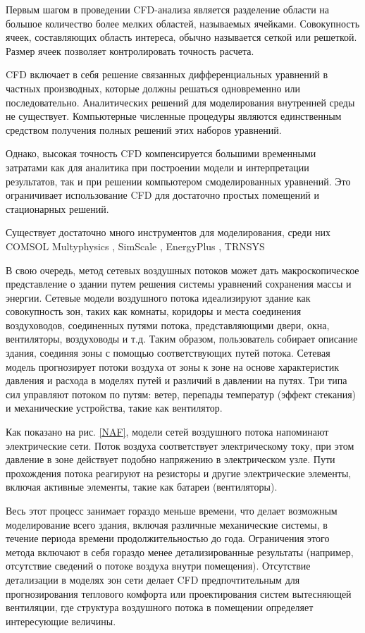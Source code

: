 Первым шагом в проведении CFD-анализа является разделение области на большое количество более мелких областей, называемых ячейками. Совокупность ячеек, составляющих область интереса, обычно называется сеткой или решеткой. Размер ячеек позволяет контролировать точность расчета.

CFD включает в себя решение связанных дифференциальных уравнений в частных производных, которые должны решаться одновременно или последовательно. Аналитических решений для моделирования внутренней среды не существует. Компьютерные численные процедуры являются единственным средством получения полных решений этих наборов уравнений.

Однако, высокая точность CFD компенсируется большими временными затратами как для аналитика при построении модели и интерпретации результатов, так и при решении компьютером смоделированных уравнений. Это ограничивает использование CFD для достаточно простых помещений и стационарных решений.

Существует достаточно много инструментов для моделирования, среди них COMSOL Multyphysics \cite{comsol}, SimScale \cite{simscale}, EnergyPlus \cite{energyplus}, TRNSYS \cite{trnsys}

\newpage

В свою очередь, метод сетевых воздушных потоков может дать макроскопическое представление о здании путем решения системы уравнений сохранения массы и энергии. Сетевые модели воздушного потока идеализируют здание как совокупность зон, таких как комнаты, коридоры и места соединения воздуховодов, соединенных путями потока, представляющими двери, окна, вентиляторы, воздуховоды и т.д. Таким образом, пользователь собирает описание здания, соединяя зоны с помощью соответствующих путей потока. Сетевая модель прогнозирует потоки воздуха от зоны к зоне на основе характеристик давления и расхода в моделях путей и различий в давлении на путях. Три типа сил управляют потоком по путям: ветер, перепады температур (эффект стекания) и механические устройства, такие как вентилятор.

Как показано на рис. \ref{NAF}, модели сетей воздушного потока напоминают электрические сети. Поток воздуха соответствует электрическому току, при этом давление в зоне действует подобно напряжению в электрическом узле. Пути прохождения потока реагируют на резисторы и другие электрические элементы, включая активные элементы, такие как батареи (вентиляторы).

Весь этот процесс занимает гораздо меньше времени, что делает возможным моделирование всего здания, включая различные механические системы, в течение периода времени продолжительностью до года. Ограничения этого метода включают в себя гораздо менее детализированные результаты (например, отсутствие сведений о потоке воздуха внутри помещения). Отсутствие детализации в моделях зон сети делает CFD предпочтительным для прогнозирования теплового комфорта или проектирования систем вытесняющей вентиляции, где структура воздушного потока в помещении определяет интересующие величины.

